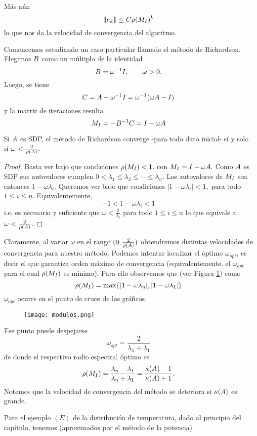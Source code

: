 Más aún
$$
\|\eb_k\|\le C\rho(\Mb_I)^k
$$
lo que nos da la velocidad de convergencia del algoritmo.

Comencemos estudiando un caso particular llamado el método de Richardson.
 Elegimos $\Bb$ como un múltiplo de la identidad
$$\Bb=\omega^{-1}\Ib, \qquad \omega>0.$$
Luego, se tiene
$$\Cb=\Ab-\omega^{-1}\Ib=\omega^{-1}(\omega\Ab-\Ib)$$
y la matriz de iteraciones resulta
$$
\Mb_I=-\Bb^{-1}\Cb=
\Ib-\omega\Ab
$$

\tcc
\begin{prop}
Si $\Ab$ es SDP, el método de Richardson converge -para todo dato inicial- sí y solo sí $\omega<\frac{2}{\rho(\Ab)}.$
\end{prop}
\etcc

\begin{proof}
 Basta ver bajo que condiciones $\rho(\Mb_I)<1$, con $
\Mb_I=
\Ib-\omega\Ab.
$ Como $\Ab$ es SDP sus autovalores cumplen $0<\lambda_1\le \lambda_2\le \cdots \le \lambda_n$. Los autovalores de $
\Mb_I$ son entonces $1-\omega\lambda_i$.  Queremos ver bajo que condiciones
$
|1-\omega\lambda_i|<1,
$ para todo $1\le i\le n$. Equivalentemente,
$$
-1< 1-\omega\lambda_i< 1
$$
i.e. es necesario y suficiente que $\omega<\frac{2}{\lambda_i}$ para todo $1\le i\le n$ lo que equivale a
$\omega<\frac{2}{\rho(\Ab)}.$
\end{proof}

Claramente, al variar $\omega$ en el rango $(0,\frac{2}{\rho(\Ab)})$ obtendremos distintas velocidades de convergencia para nuestro método. Podemos intentar localizar el óptimo $\omega_{opt}$, es decir el que garantiza orden máximo de convergencia (equivalentemente, el $\omega_{opt}$ para el cual $\rho(\Mb_I)$ es mínimo). Para ello observemos que   (ver Figura \ref{fig:modulos}) como
$$
\rho(\Mb_I)=\max\{
|1-\omega   \lambda_n|,|1-\omega   \lambda_1|\}
$$
$\omega_{opt}$ ocurre en el punto de cruce de los gráficos.
\begin{figure}[h]
\label{fig:modulos}
\centering\texttt{[image: modulos.png]}
\end{figure}
Ese punto puede despejarse 
$$
\omega_{opt}=\frac{2}{\lambda_n+\lambda_1}
$$
de donde el respectivo radio espectral óptimo es 
$$\rho(\Mb_I)=\frac{\lambda_n-\lambda_1}{\lambda_n+\lambda_1}=\frac{\kappa(\Ab)-1}{\kappa(\Ab)+1}.
$$
Notemos que la velocidad de convergencia del método se deteriora si  $\kappa(\Ab)$ es grande.

\tcc
Para el ejemplo $(E)$ de la distribución de temperatura, dado al principio del capítulo, tenemos (aproximados por el método de la potencia)

